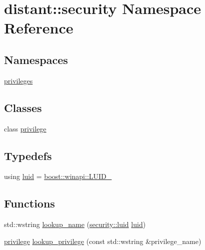 \hypertarget{namespacedistant_1_1security}{}\section{distant\+:\+:security Namespace Reference}
\label{namespacedistant_1_1security}
\subsection*{Namespaces}
\begin{DoxyCompactItemize}
\item 
 \mbox{\hyperlink{namespacedistant_1_1security_1_1privileges}{privileges}}
\end{DoxyCompactItemize}
\subsection*{Classes}
\begin{DoxyCompactItemize}
\item 
class \mbox{\hyperlink{classdistant_1_1security_1_1privilege}{privilege}}
\end{DoxyCompactItemize}
\subsection*{Typedefs}
\begin{DoxyCompactItemize}
\item 
using \mbox{\hyperlink{namespacedistant_1_1security_a67e703359629612133171032e9beecce}{luid}} = \mbox{\hyperlink{namespaceboost_1_1winapi_aeabc0bea0a606e83e4fab8767dfc38db}{boost\+::winapi\+::\+L\+U\+I\+D\+\_\+}}
\end{DoxyCompactItemize}
\subsection*{Functions}
\begin{DoxyCompactItemize}
\item 
std\+::wstring \mbox{\hyperlink{namespacedistant_1_1security_a9f354d6ecb666413f3f210ce22ef5497}{lookup\+\_\+name}} (\mbox{\hyperlink{namespacedistant_1_1security_a67e703359629612133171032e9beecce}{security\+::luid}} \mbox{\hyperlink{namespacedistant_1_1security_a67e703359629612133171032e9beecce}{luid}})
\item 
\mbox{\hyperlink{classdistant_1_1security_1_1privilege}{privilege}} \mbox{\hyperlink{namespacedistant_1_1security_a50475ae37fdbf2555a3778e854facc5a}{lookup\+\_\+privilege}} (const std\+::wstring \&privilege\+\_\+name)
\end{DoxyCompactItemize}


